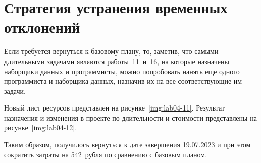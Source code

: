 \clearpage
\section{Стратегия устранения временных отклонений}

Если требуется вернуться к базовому плану, то, заметив, что самыми длительными
задачами являются работы~11~и~16, на которые назначены наборщики данных и
программисты, можно попробовать нанять еще одного программиста и наборщика
данных, назначив их на все соответствующие им задачи.

Новый лист ресурсов представлен на рисунке~\ref{img:lab04-11}. Результат
назначения и изменения в проекте по длительности и стоимости представлены на
рисунке~\ref{img:lab04-12}.



Таким образом, получилось вернуться к дате завершения 19.07.2023 и при этом
сократить затраты на 542~рубля по сравнению с базовым планом.
